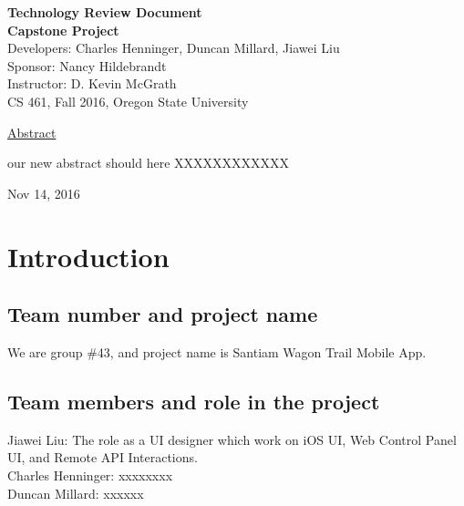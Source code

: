 \documentclass[letterpaper, 10pt,titlepage]{article}
\newcommand\tab[1][1cm]{\hspace*{#1}}
\begin{document}
\begin{titlepage}
\begin{center}
    \Huge
    \textbf{Technology Review Document}\\
    \textbf{Capstone Project}\\
    \vspace{1.0cm}
    \large
    Developers: Charles Henninger, Duncan Millard, Jiawei Liu\\
    Sponsor: Nancy Hildebrandt\\
    \vspace{1.5cm}
    \large
    Instructor: D. Kevin McGrath\\

    \large
    CS 461, Fall 2016, Oregon State University\\    

    \vspace{3.2cm}

    \large
    \underline{Abstract}\\
    \vspace{0.3cm}
    \end{center}
    \large

    \tab our new abstract should here XXXXXXXXXXXX
    
    \vspace{0.8cm}
    \vfill
    
\begin{center}    
    Nov 14, 2016

\end{center}
\end{titlepage}


\tableofcontents
\newpage



\section{Introduction}
\subsection{Team number and project name}
We are group \#43, and project name is Santiam Wagon Trail Mobile App.


\subsection{Team members and role in the project}
Jiawei Liu: The role as a UI designer which work on iOS UI, Web Control Panel UI, and Remote API Interactions. \\
Charles Henninger: xxxxxxxx\\
Duncan Millard: xxxxxx
\end{document}
